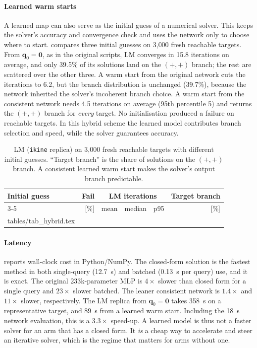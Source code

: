 \documentclass[conference]{IEEEtran}
\makeatletter
\newcommand{\tabinput}[1]{\@@input #1 }
\newcommand{\q}{\mathbf{q}}
\newcommand{\code}[1]{\texttt{#1}}
\makeatother
\begin{document}
\paragraph{Learned warm starts}
A learned map can also serve as the initial guess of a numerical solver. This keeps the solver's accuracy and convergence check and uses the network only to choose where to start.  compares three initial guesses on 3{,}000 fresh reachable targets. From $\q_0=\mathbf{0}$, as in the original scripts, LM converges in 15.8 iterations on average, and only 39.5\% of its solutions land on the $(+,+)$ branch; the rest are scattered over the other three. A warm start from the original network cuts the iterations to 6.2, but the branch distribution is unchanged (39.7\%), because the network inherited the solver's incoherent branch choice. A warm start from the consistent network needs 4.5 iterations on average (95th percentile 5) and returns the $(+,+)$ branch for \emph{every} target. No initialisation produced a failure on reachable targets. In this hybrid scheme the learned model contributes branch selection and speed, while the solver guarantees accuracy.

\begin{table}[t]
\centering
\small
\caption{LM (\code{ikine} replica) on 3{,}000 fresh reachable targets with different initial guesses. ``Target branch'' is the share of solutions on the $(+,+)$ branch. A consistent learned warm start makes the solver's output branch predictable.}
\label{tab:hybrid}
\begin{tabular}{lrrrrr}
\toprule
Initial guess & Fail & \multicolumn{3}{c}{LM iterations} & Target branch \\
\cmidrule(lr){3-5}
 & [\%] & mean & median & p95 & [\%] \\
\midrule
\tabinput{tables/tab_hybrid.tex}
\bottomrule
\end{tabular}
\end{table}

\paragraph{Latency}
 reports wall-clock cost in Python/NumPy. The closed-form solution is the fastest method in both single-query (12.7~\textmu s) and batched (0.13~\textmu s per query) use, and it is exact. The original 233k-parameter MLP is $4\times$ slower than closed form for a single query and $23\times$ slower batched. The leaner consistent network is $1.4\times$ and $11\times$ slower, respectively. The LM replica from $\q_0=\mathbf{0}$ takes 358~\textmu s on a representative target, and 89~\textmu s from a learned warm start. Including the 18~\textmu s network evaluation, this is a $3.3\times$ speed-up. A learned model is thus not a faster solver for an arm that has a closed form. It \emph{is} a cheap way to accelerate and steer an iterative solver, which is the regime that matters for arms without one.
\end{document}
